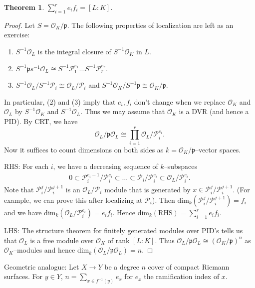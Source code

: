 \documentclass{article}
\theoremstyle{definition}
\newtheorem{theorem}{Theorem}[section]
\begin{document}
\begin{theorem}\label{theorem11.1}
    $\sum_{i=1}^{r} e_i f_i = [L:K]$.
\end{theorem}
\begin{proof}
    Let $S = \mathcal{O}_K/\mathfrak{p}$. The following properties of localization are left as an exercise:
    \begin{enumerate}[(1)]
        \item $S^{-1}\mathcal{O}_L$ is the integral closure of $S^{-1}\mathcal{O}_K$ in $L$.
        \item $S^{-1}\mathfrak{p} s^{-1}\mathcal{O}_L \cong S^{-1} \mathcal{P}_1^{e_1}\ldots S^{-1}\mathcal{P}_r^{e_r}$.
        \item $S^{-1}\mathcal{O}_L/S^{-1}\mathcal{P}_i \cong \mathcal{O}_L/\mathcal{P}_i$ and $S^{-1}\mathcal{O}_K/S^{-1}\mathfrak{p} \cong \mathcal{O}_K/\mathfrak{p}$.
    \end{enumerate}
    In particular, (2) and (3) imply that $e_i, f_i$ don't change when we replace $\mathcal{O}_K$ and $\mathcal{O}_L$ by $S^{-1}\mathcal{O}_K$ and $S^{-1}\mathcal{O}_L$. Thus we may assume that $\mathcal{O}_K$ is a DVR (and hence a PID). By CRT, we have $$\mathcal{O}_L/\mathfrak{p}\mathcal{O}_L \cong \prod_{i=1}^{r} \mathcal{O}_L/\mathcal{P}_i^{e_i}.$$ Now it suffices to count dimensions on both sides as $k=\mathcal{O}_K/\mathfrak{p}$--vector spaces.
    \vspace{1mm}
     
    RHS: For each $i$, we have a decreasing sequence of $k$--subspaces 
    \begin{align*}
        0 \subset \mathcal{P}_i^{e_i-1}/\mathcal{P}_i^{e_i} \subset \ldots \subset  \mathcal{P}_i/\mathcal{P}_i^{e_i} \subset \mathcal{O}_L/\mathcal{P}_i^{e_i}.
    \end{align*}
    Note that $\mathcal{P}_i^j/\mathcal{P}_i^{j+1}$ is an $\mathcal{O}_L/\mathcal{P}_i$ module that is generated by $ x \in \mathcal{P}_i^j / \mathcal{P}_i^{j+1}$. (For example, we can prove this after localizing at $\mathcal{P}_i$). Then $\text{dim}_k(\mathcal{P}_i^j/\mathcal{P}_i^{j+1}) = f_i$ and we have $\text{dim}_k(\mathcal{O}_L/\mathcal{P}_i^{e_i})= e_if_i$. Hence $\text{dim}_k(\text{RHS})=\sum_{i=1}^{r} e_if_i$.
    \vspace{1mm}
     
    LHS: The structure theorem for finitely generated modules over PID's tells us that $\mathcal{O}_L$ is a free module over $\mathcal{O}_K$ of rank $[L:K]$. Thus $\mathcal{O}_L/\mathfrak{p}\mathcal{O}_L \cong (\mathcal{O}_K/\mathfrak{p})^{n}$ as $\mathcal{O}_K$--modules and hence $\text{dim}_k(\mathcal{O}_L/\mathfrak{p}\mathcal{O}_L)=n$.
\end{proof}
Geometric analogue: Let $X \to Y$ be a degree $n$ cover of compact Riemann surfaces. For $y \in Y$, $n = \sum_{x \in f^{-1}(y)} e_x$ for $e_x$ the ramification index of $x.$
\vspace{1mm}
 
\end{document}
